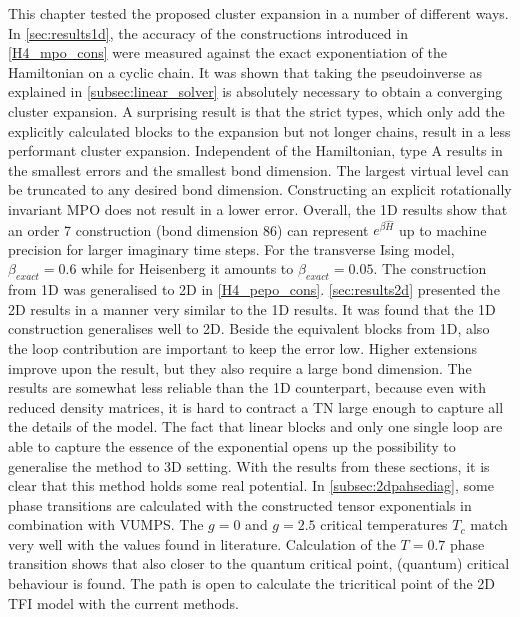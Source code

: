 This chapter tested the proposed cluster expansion in a number of different ways. In \cref{sec:results1d}, the accuracy of the constructions introduced in \cref{H4_mpo_cons} were measured against the exact exponentiation of the Hamiltonian on a cyclic chain. It was shown that taking the pseudoinverse as explained in \cref{subsec:linear_solver} is absolutely necessary to obtain a converging cluster expansion.
A surprising result is that the strict types, which only add the explicitly calculated blocks to the expansion but not longer chains, result in a less performant cluster expansion. Independent of the Hamiltonian, type A results in the smallest errors and the smallest bond dimension. The largest virtual level can be truncated to any desired bond dimension. Constructing an explicit rotationally invariant \Gls{MPO} does not result in a lower error.
Overall, the 1D results show that an order 7 construction (bond dimension 86) can represent  $e^{\beta \hat{H}}$ up to machine precision for larger imaginary time steps. For the transverse Ising model, $\beta_{exact} = 0.6$ while for Heisenberg it amounts to $\beta_{exact} = 0.05$.
The construction from 1D was generalised to 2D in \cref{H4_pepo_cons}. \cref{sec:results2d} presented the 2D results in a manner very similar to the 1D results. It was found that the 1D construction generalises well to 2D. Beside the equivalent blocks from 1D, also the loop contribution are important to keep the error low. Higher extensions improve upon the result, but they also require a large bond dimension. The results are somewhat less reliable than the 1D counterpart, because even with reduced density matrices, it is hard to contract a \Gls{TN} large enough to capture all the details of the model.
The fact that linear blocks and only one single loop are able to capture the essence of the exponential opens up the possibility to generalise the method to 3D setting.
With the results from these sections, it is clear that this method holds some real potential. In \cref{subsec:2dpahsediag}, some phase transitions are calculated with the constructed tensor exponentials in combination with \Gls{VUMPS}. The $g=0$ and $g=2.5$ critical temperatures $T_c$ match very well with the values found in literature. Calculation of the $T=0.7$ phase transition shows that also closer to the quantum critical point, (quantum) critical behaviour is found. The path is open to calculate the tricritical point of the 2D \Gls{TFI} model with the current methods.